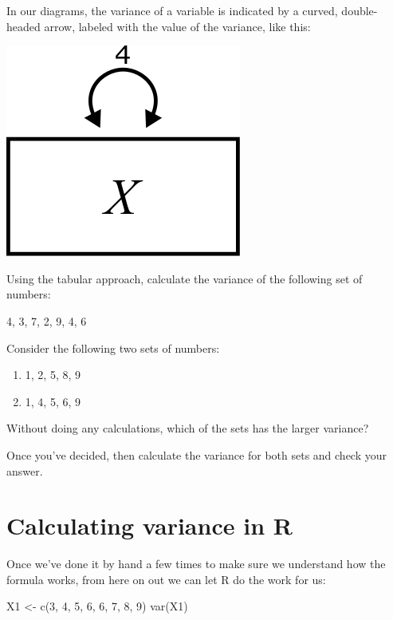 \documentclass[
]{book}
\newenvironment{Shaded}{\begin{snugshade}}{\end{snugshade}}
\newcommand{\DecValTok}[1]{\textcolor[rgb]{0.00,0.00,0.81}{#1}}
\newcommand{\FunctionTok}[1]{\textcolor[rgb]{0.00,0.00,0.00}{#1}}
\newcommand{\NormalTok}[1]{#1}
\newcommand{\OtherTok}[1]{\textcolor[rgb]{0.56,0.35,0.01}{#1}}
\begin{document}
In our diagrams, the variance of a variable is indicated by a curved, double-headed arrow, labeled with the value of the variance, like this:

\begin{center}\includegraphics{graphics/variance_labeled} \end{center}

Using the tabular approach, calculate the variance of the following set of numbers:

4, 3, 7, 2, 9, 4, 6

Consider the following two sets of numbers:

\begin{enumerate}
\def\labelenumi{\Alph{enumi})}
\item
  1, 2, 5, 8, 9
\item
  1, 4, 5, 6, 9
\end{enumerate}

Without doing any calculations, which of the sets has the larger variance?

Once you've decided, then calculate the variance for both sets and check your answer.

\hypertarget{variance-r}{%
\section{Calculating variance in R}\label{variance-r}}

Once we've done it by hand a few times to make sure we understand how the formula works, from here on out we can let R do the work for us:

\begin{Shaded}
\begin{Highlighting}[]
\NormalTok{X1 }\OtherTok{\textless{}{-}} \FunctionTok{c}\NormalTok{(}\DecValTok{3}\NormalTok{, }\DecValTok{4}\NormalTok{, }\DecValTok{5}\NormalTok{, }\DecValTok{6}\NormalTok{, }\DecValTok{6}\NormalTok{, }\DecValTok{7}\NormalTok{, }\DecValTok{8}\NormalTok{, }\DecValTok{9}\NormalTok{)}
\FunctionTok{var}\NormalTok{(X1)}
\end{Highlighting}
\end{Shaded}
\end{document}

